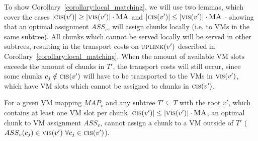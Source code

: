 \documentclass[9pt,twocolumn]{scrartcl}
\newcommand{\VmSlot}{\text{VM slot}}
\newcommand{\VmSlots}{\VmSlot\text{s}}
\newcommand{\Chunk}{\ensuremath{c}}
\newcommand{\MaFactor}{\ensuremath{\textsc{MA}}}
\newcommand{\VmChunkAssignment}{\ensuremath{ASS_v}}
\newcommand{\NodeMapping}{\ensuremath{MAP_v}}
\newcommand{\SubstrateNode}{\ensuremath{v}}
\newcommand{\Tree}{\ensuremath{T}}
\begin{document}
To show Corollary~\ref{corollary:local_matching}, we will use two lemmas, which
cover the cases $|\ChunkCount(\SubstrateNode')| \geq
|\VmCount(\SubstrateNode')| \cdot \MaFactor$ and
$|\ChunkCount(\SubstrateNode')| \leq
|\VmCount(\SubstrateNode')| \cdot \MaFactor$ - showing that an optimal
assignment
$\VmChunkAssignment$, will assign chunks locally (i.e. to VMs in the
same subtree). All chunks which cannot be served locally will be served in
other subtrees, resulting in the transport costs on $\Uplink(\SubstrateNode')$
described in Corollary~\ref{corollary:local_matching}. When the amount of
available $\VmSlots$
exceeds the amount of chunks in $\Tree'$, the transport costs will still occur,
since some chunks $\Chunk_j \notin \ChunkCount(\SubstrateNode')$ will have to
be transported to the VMs in $\VmCount(\SubstrateNode')$, which have $\VmSlots$
which cannot be
assigned to chunks in $\ChunkCount(\SubstrateNode')$.

\begin{lemma}
\label{lemma:matching1}
For a given VM mapping $\NodeMapping$ and any subtree $\Tree' \subseteq
\Tree$ with the root $\SubstrateNode'$, which contains at least one $\VmSlot$
per
chunk $|\ChunkCount(\SubstrateNode')| \leq |\VmCount(\SubstrateNode')| \cdot
\MaFactor$, an
optimal chunk to VM assignment $\VmChunkAssignment$, cannot assign a chunk
to a VM outside of $\Tree'$ ($\VmChunkAssignment(\Chunk_j) \in
\VmCount(\SubstrateNode')~ \forall \Chunk_j \in \ChunkCount(\SubstrateNode')$).
\end{lemma}
\end{document}
